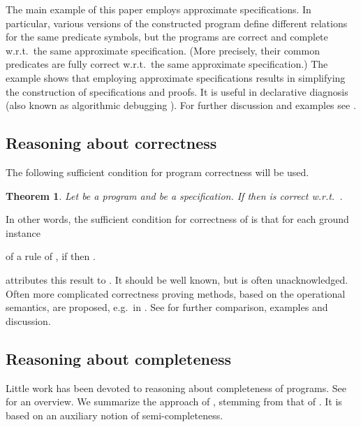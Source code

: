 \documentclass{tlp}
\newtheorem{theorem}{Theorem}
\begin{document}
The main example of this paper employs approximate specifications.
In particular,
  various versions of the constructed program define different relations
  for the same predicate symbols, but the programs 
  are correct and complete w.r.t.\ the same approximate specification.
(More precisely, their common predicates are
fully correct w.r.t.\ the same approximate specification.)
The example shows that employing approximate specifications
results in simplifying the construction of specifications and proofs.
It is useful \cite{drabent.tocl16} in declarative diagnosis
(also known as algorithmic debugging \cite{Shapiro.book}).
For further discussion and examples see 
\cite{drabent.tocl16,DBLP:journals/tplp/DrabentM05shorter}.  












\subsection{Reasoning about correctness}
The following sufficient condition for program correctness
will be used.
\begin{theorem}
\label{th:correctness}
Let  be a program and  be a specification.
If    then   is correct w.r.t.\ .
\end{theorem}
\pagebreak[3]
In other words, the sufficient condition for correctness of  is that
     for each ground instance 
    
    of a rule of ,
     if  then .



 attributes this result to \cite{Clark79}.
It  should be well known, but is often unacknowledged.
Often more complicated correctness proving methods, based on the operational
semantics, are proposed, e.g.\ in  \cite{Apt-Prolog}.
See \cite{DBLP:journals/tplp/DrabentM05shorter,drabent.tocl16}
for further comparison, examples and discussion.



\subsection{Reasoning about completeness}
\label{subsec:completeness}
Little work has been devoted to reasoning about completeness of programs.
See \cite{drabent.tocl16} for an overview.  We summarize the approach
of \cite{drabent.tocl16}, stemming from that of
\cite{DBLP:journals/tplp/DrabentM05shorter}.
It is based on an auxiliary notion of semi-completeness.
\end{document}
